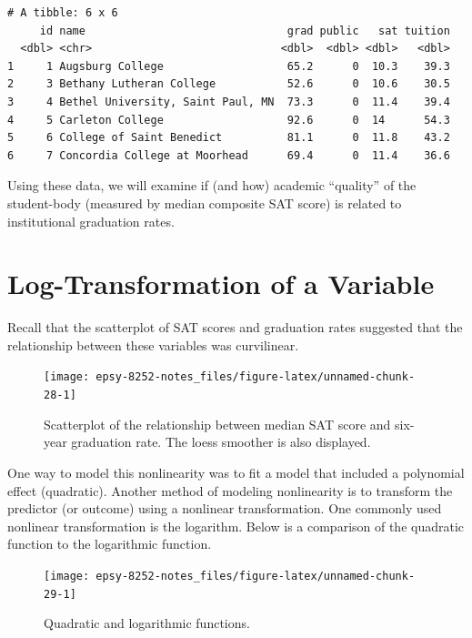 \documentclass[]{book}
\begin{document}
\begin{verbatim}
# A tibble: 6 x 6
     id name                               grad public   sat tuition
  <dbl> <chr>                             <dbl>  <dbl> <dbl>   <dbl>
1     1 Augsburg College                   65.2      0  10.3    39.3
2     3 Bethany Lutheran College           52.6      0  10.6    30.5
3     4 Bethel University, Saint Paul, MN  73.3      0  11.4    39.4
4     5 Carleton College                   92.6      0  14      54.3
5     6 College of Saint Benedict          81.1      0  11.8    43.2
6     7 Concordia College at Moorhead      69.4      0  11.4    36.6
\end{verbatim}

Using these data, we will examine if (and how) academic ``quality'' of the student-body (measured by median composite SAT score) is related to institutional graduation rates.

\hypertarget{log-transformation-of-a-variable}{%
\section{Log-Transformation of a Variable}\label{log-transformation-of-a-variable}}

Recall that the scatterplot of SAT scores and graduation rates suggested that the relationship between these variables was curvilinear.

\begin{figure}

{\centering \texttt{[image: epsy-8252-notes\_files/figure-latex/unnamed-chunk-28-1]} 

}

\caption{Scatterplot of the relationship between median SAT score and six-year graduation rate. The loess smoother is also displayed.}\label{fig:unnamed-chunk-28}
\end{figure}

One way to model this nonlinearity was to fit a model that included a polynomial effect (quadratic). Another method of modeling nonlinearity is to transform the predictor (or outcome) using a nonlinear transformation. One commonly used nonlinear transformation is the logarithm. Below is a comparison of the quadratic function to the logarithmic function.

\begin{figure}

{\centering \texttt{[image: epsy-8252-notes\_files/figure-latex/unnamed-chunk-29-1]} 

}

\caption{Quadratic and logarithmic functions.}\label{fig:unnamed-chunk-29}
\end{figure}
\end{document}
